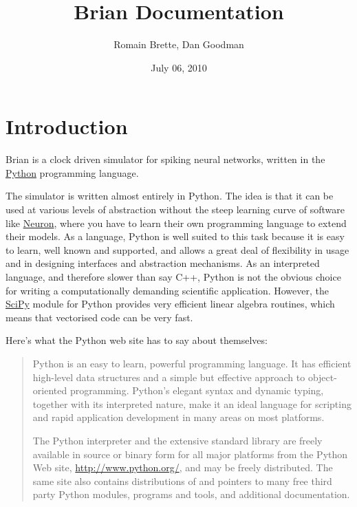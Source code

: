 \documentclass[letterpaper,10pt,english]{manual}
\title{Brian Documentation}
\date{July 06, 2010}
\author{Romain Brette, Dan Goodman}
\begin{document}
\maketitle
\tableofcontents
\hypertarget{--doc-index}{}

\hypertarget{module-brian}{}
\resetcurrentobjects
\hypertarget{--doc-introduction}{}

\chapter{Introduction}

Brian is a clock driven simulator for spiking neural networks, written in the \href{http://www.python.org}{Python} programming language.

The simulator is written almost entirely in Python. The idea is that
it can be used at various levels
of abstraction without the steep learning curve of software like \href{http://www.neuron.yale.edu/neuron/}{Neuron}, where you have to learn their
own programming language to extend their models. As a language, Python is well suited to this task
because it is easy to learn, well known and supported, and allows a great deal of flexibility in usage
and in designing interfaces and abstraction mechanisms. As an interpreted language, and therefore slower
than say C++, Python is not the obvious choice for writing a computationally demanding scientific
application. However, the \href{http://www.scipy.org/}{SciPy} module for Python provides very efficient linear algebra routines, which
means that vectorised code can be very fast.

Here's what the Python web site has to say about themselves:
\begin{quote}

Python is an easy to learn, powerful programming language. It has efficient
high-level data structures and a simple but effective approach to
object-oriented programming. Python's elegant syntax and dynamic typing,
together with its interpreted nature, make it an ideal language for
scripting and rapid application development in many areas on most platforms.

The Python interpreter and the extensive standard library are freely
available in source or binary form for all major platforms from the
Python Web site, \href{http://www.python.org/}{http://www.python.org/}, and may be freely distributed.
The same site also contains distributions of and pointers to many free
third party Python modules, programs and tools, and additional documentation.
\end{quote}
\end{document}
